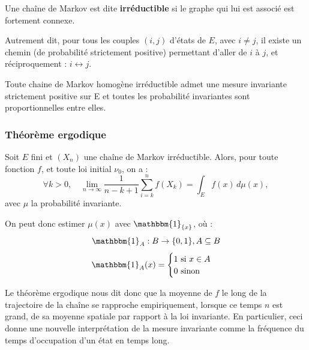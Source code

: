 \documentclass{article}
\begin{document}
\begin{tcolorbox}[colback=white,colframe=blue!80!black,title=Chaîne de Markov irréductible]
Une chaîne de Markov est dite \textbf{irréductible} si le graphe qui lui est associé est fortement connexe.

Autrement dit, pour tous les couples $(i, j)$ d'états de $E$, avec $i \neq j$, il existe un chemin (de probabilité strictement positive) permettant d'aller de $i$ à $j$, et réciproquement : $i \leftrightarrow j$.
\end{tcolorbox}

\begin{tcolorbox}[colback=white,colframe=blue!80!black,title=Probabilité invariantes d'une chaîne de Markov irréductible]
Toute chaine de Markov homogène irréductible admet une mesure invariante strictement positive sur E et toutes les probabilité invariantes sont proportionnelles entre elles.
\end{tcolorbox}

\subsubsection{Théorème ergodique}

\begin{tcolorbox}[colback=white,colframe=red!80!black,title=Théorème ergodique (admis)]

Soit $E$ fini et $(X_n)$ une chaîne de Markov irréductible.
Alors, pour toute fonction $f$, et toute loi initial $\nu_0$, on a :
\[
    \forall k > 0, \quad \lim_{n \to \infty}{ \frac{1}{n-k+1}\sum_{i=k}^{n}{f(X_k)} } = \int_{E} f(x) \,d{\mu(x)},
\]
avec $\mu$ la probabilité invariante.

\end{tcolorbox}

On peut donc estimer $\mu(x)$ avec $\mathbbm{1}_{\{x\}} $, où :
\[
    \mathbbm{1}_{A} : B \to \{0,1\}, A \subseteq B
\]
\[
    \mathbbm{1}_{A}(x) = \begin{cases}
        1 \text{ si } x \in A \\
        0 \text{ sinon} 
    \end{cases}
\]

Le théorème ergodique nous dit donc que la moyenne de $f$ le long de la trajectoire de la chaîne se rapproche empiriquement,
lorsque ce temps $n$ est grand, de sa moyenne spatiale par rapport à la loi invariante. En particulier, 
ceci donne une nouvelle interprétation de la mesure invariante comme la fréquence du temps d'occupation d'un état en temps long.
\end{document}
